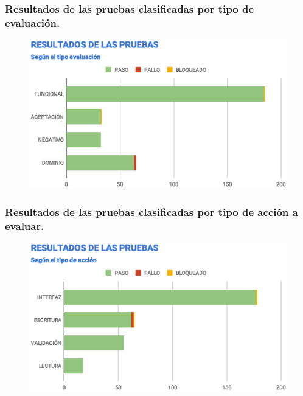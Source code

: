 \documentclass{beamer}
\begin{document}
\begin{frame}
\frametitle{Resultados de las pruebas clasificadas por tipo de evaluación.}
\begin{figure}
\centering
\includegraphics[width=1.0\textwidth]{graphics/results-tests.eps}
\end{figure}
\end{frame}

\begin{frame}
\frametitle{Resultados de las pruebas clasificadas por tipo de acción a evaluar.}
\begin{figure}
\centering
\includegraphics[width=1.0\textwidth]{graphics/results-type.eps}
\end{figure}
\end{frame}
\end{document}
